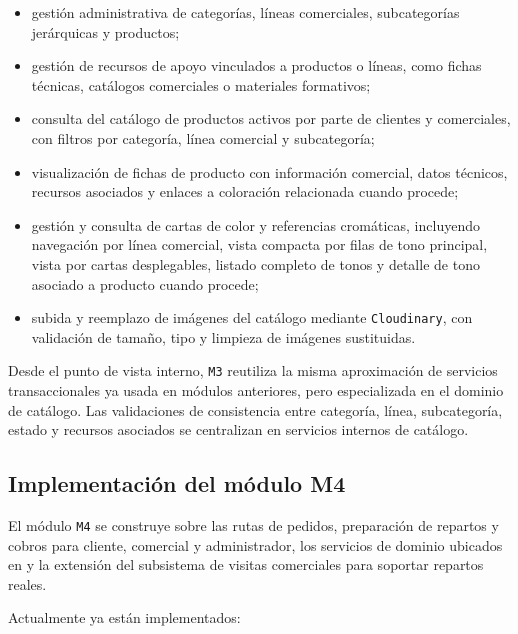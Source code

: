 \begin{itemize}
    \item gestión administrativa de categorías, líneas comerciales, subcategorías jerárquicas y productos;
    \item gestión de recursos de apoyo vinculados a productos o líneas, como fichas técnicas, catálogos comerciales o materiales formativos;
    \item consulta del catálogo de productos activos por parte de clientes y comerciales, con filtros por categoría, línea comercial y subcategoría;
    \item visualización de fichas de producto con información comercial, datos técnicos, recursos asociados y enlaces a coloración relacionada cuando procede;
    \item gestión y consulta de cartas de color y referencias cromáticas, incluyendo navegación por línea comercial, vista compacta por filas de tono principal, vista por cartas desplegables, listado completo de tonos y detalle de tono asociado a producto cuando procede;
    \item subida y reemplazo de imágenes del catálogo mediante \texttt{Cloudinary}, con validación de tamaño, tipo y limpieza de imágenes sustituidas.
\end{itemize}

Desde el punto de vista interno, \texttt{M3} reutiliza la misma aproximación de servicios transaccionales ya usada en módulos anteriores, pero especializada en el dominio de catálogo. Las validaciones de consistencia entre categoría, línea, subcategoría, estado y recursos asociados se centralizan en servicios internos de catálogo.

\subsection{Implementación del módulo M4}

El módulo \texttt{M4} se construye sobre las rutas de pedidos, preparación de repartos y cobros para cliente, comercial y administrador, los servicios de dominio ubicados en  y la extensión del subsistema de visitas comerciales para soportar repartos reales.

Actualmente ya están implementados:

